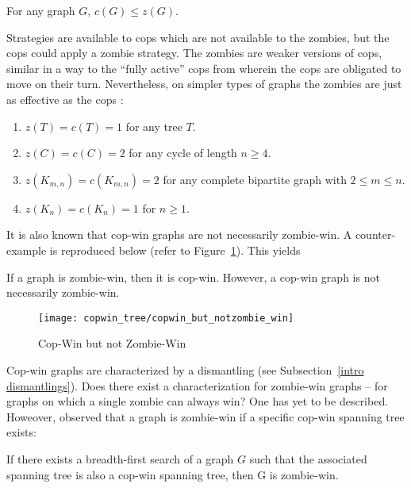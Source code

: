 \begin{lemma}
For any graph $G$, $c(G) \leq z(G)$.
\end{lemma}

Strategies are available to cops which are not available to the zombies, but the cops could apply a zombie strategy. The zombies are weaker versions of cops, similar in a way to the ``fully active'' cops from \cite{gromovikov2018fully} wherein the cops are obligated to move on their turn. Nevertheless, on simpler types of graphs the zombies are just as effective as the cops \cite{fitzpatrick2016deterministic}:

\begin{observation}
  \begin{enumerate}
    \item $z(T) = c(T) = 1$ for any tree $T$.
    \item $z(C) = c(C) = 2$ for any cycle of length $n \geq 4$.
    \item $z(K_{m,n}) = c(K_{m,n}) = 2$ for any complete bipartite graph with $2 \leq m \leq n$.
    \item $z(K_n) = c(K_n) = 1$ for $n \geq 1$.
  \end{enumerate}
\end{observation}

It is also known \cite{fitzpatrick2016deterministic} that cop-win graphs are not necessarily zombie-win. A counter-example  is reproduced below (refer to Figure~\ref{fig:copwin_but_notzombie_win}). This yields

\begin{theorem}
If a graph is zombie-win, then it is cop-win. However, a cop-win graph is not necessarily zombie-win.
\end{theorem}

\begin{figure}
\centering
\texttt{[image: copwin\_tree/copwin\_but\_notzombie\_win]}
\caption{Cop-Win but not Zombie-Win \label{fig:copwin_but_notzombie_win}}
\end{figure}

Cop-win graphs are characterized by a dismantling (see Subsection~\ref{intro dismantlings}). Does there exist a characterization for zombie-win graphs -- for graphs on which a single zombie can always win? One has yet to be described. Howeover, \cite{fitzpatrick2016deterministic} observed that a graph is zombie-win if a specific cop-win spanning tree exists:

\begin{theorem} If there exists a breadth-first search of a graph $G$ such that the associated spanning tree is also a cop-win spanning tree, then G is zombie-win. \label{thm:zombie_tree}
\end{theorem}

